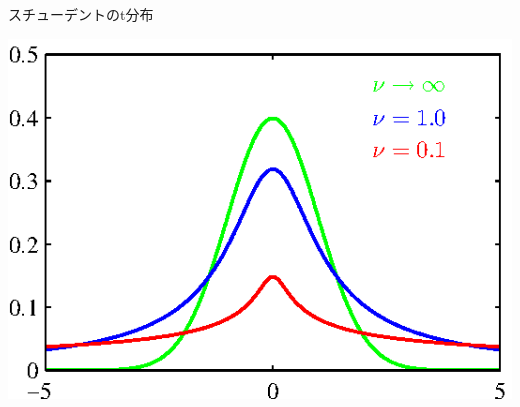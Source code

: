 \begin{frame}{スチューデントのt分布}
 \begin{center}
  \includegraphics[scale=1.0]{./figure/Figure2.15.eps}
 \end{center}
\end{frame}

